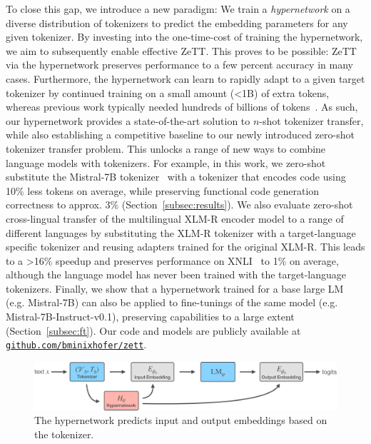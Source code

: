\documentclass{article}
\begin{document}
To close this gap, we introduce a new paradigm: We train a \textit{hypernetwork} on a diverse distribution of tokenizers to predict the embedding parameters for any given tokenizer. By investing into the one-time-cost of training the hypernetwork, we aim to subsequently enable effective ZeTT. This proves to be possible: ZeTT via the hypernetwork preserves performance to a few percent accuracy in many cases. Furthermore, the hypernetwork can learn to rapidly adapt to a given target tokenizer by continued training on a small amount (<1B) of extra tokens, whereas previous work typically needed hundreds of billions of tokens~\citep{dagan2024getting}. As such, our hypernetwork provides a state-of-the-art solution to $n$-shot tokenizer transfer, while also establishing a competitive baseline to our newly introduced zero-shot tokenizer transfer problem.
This unlocks a range of new ways to combine language models with tokenizers. For example, in this work, we zero-shot substitute the Mistral-7B tokenizer~\citep{jiang2023mistral} with a tokenizer that encodes code using 10\% less tokens on average, while preserving functional code generation correctness to approx. 3\% (Section~\ref{subsec:results}). We also evaluate zero-shot cross-lingual transfer of the multilingual XLM-R encoder model to a range of different languages by substituting the XLM-R tokenizer with a target-language specific tokenizer and reusing adapters trained for the original XLM-R. This leads to a >16\% speedup and preserves performance on XNLI~\citep{conneau-etal-2018-xnli} to 1\% on average, although the language model has never been trained with the target-language tokenizers. Finally, we show that a hypernetwork trained for a base large LM (e.g. Mistral-7B) can also be applied to fine-tunings of the same model (e.g. Mistral-7B-Instruct-v0.1), preserving capabilities to a large extent (Section~\ref{subsec:ft}). Our code and models are publicly available at \href{https://github.com/bminixhofer/zett}{\nolinkurl{github.com/bminixhofer/zett}}.


\begin{figure}
    \centering
\includegraphics[width=0.9\linewidth]{figures/training-cropped.pdf}
    \caption{The hypernetwork predicts input and output embeddings based on the tokenizer.}
    \label{fig:training}
\end{figure}
\end{document}
